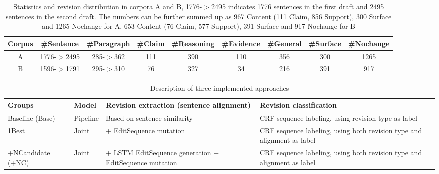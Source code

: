 \documentclass[11pt]{article}
\begin{document}
\begin{table*}
\small
\begin{center}
\begin{tabular}{c|c|c|c|c|c|c|c|c}
\hline
\textbf{Corpus} & \textbf{\#Sentence} & \textbf{\#Paragraph} & \textbf{\#Claim} & \textbf{\#Reasoning} & \textbf{\#Evidence} & \textbf{\#General} & \textbf{\#Surface} & \textbf{\#Nochange} \\
\hline
A  & 1776-$>$2495 & 285-$>$362 & 111 & 390 & 110 & 356 & 300 & 1265\\
B  & 1596-$>$1791& 295-$>$310& 76 & 327 & 34 & 216 & 391 & 917\\
\hline
\end{tabular}
\end{center}
\caption{Statistics and revision distribution in corpora A and B, 1776-$>$2495 indicates 1776 sentences in the first draft and 2495 sentences in the second draft. The numbers can be further summed up as 967 Content (111 Claim, 856 Support), 300 Surface and 1265 Nochange for A, 653 Content (76 Claim, 577 Support), 391 Surface and 917 Nochange for B}
\label{table:data}
\end{table*}

\begin{table*}
\small
\begin{tabular}{p{}|l|p{}|p{}}
\hline
\textbf{Groups} & \textbf{Model} & \textbf{Revision extraction (sentence alignment)} & \textbf{Revision classification} 
\\
\hline
Baseline (Base) & Pipeline & Based on sentence similarity \cite{zhang-litman:2014:W14-18} & CRF sequence labeling, using revision type as label \cite{zhang-litman:2016:N16-1}\\
\hline
1Best & Joint & \cite{zhang-litman:2014:W14-18} + EditSequence mutation& CRF sequence labeling, using both revision type and alignment as label \\
\hline
+NCandidate (+NC) & Joint & \cite{zhang-litman:2014:W14-18} + LSTM EditSequence generation + EditSequence mutation &  CRF sequence labeling, using both revision type and alignment as label\\ 
\hline
\end{tabular}
\caption{Description of three implemented approaches}
\label{table:featuregroups}
\end{table*}
\end{document}
